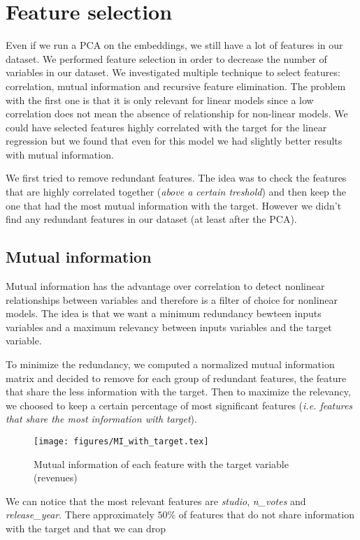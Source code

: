 \section{Feature selection}

Even if we run a PCA on the embeddings, we still have a lot of features in our dataset. We performed feature selection in order to decrease the number of variables in our dataset. We investigated multiple technique to select features: correlation, mutual information and recursive feature elimination. The problem with the first one is that it is only relevant for linear models since a low correlation does not mean the absence of relationship for non-linear models. We could have selected features highly correlated with the target for the linear regression but we found that even for this model we had slightly better results with mutual information.

We first tried to remove redundant features. The idea was to check the features that are highly correlated together (\textit{above a certain treshold}) and then keep the one that had the most mutual information with the target. However we didn't find any redundant features in our dataset (at least after the PCA).

\subsection{Mutual information}

Mutual information has the advantage over correlation to detect nonlinear relationships between variables and therefore is a filter of choice for nonlinear models. The idea is that we want a minimum redundancy bewteen inputs variables and a maximum relevancy between inputs variables and the target variable.

To minimize the redundancy, we computed a normalized mutual information matrix and decided to remove for each group of redundant features, the feature that share the less information with the target.
Then to maximize the relevancy, we choosed to keep a certain percentage of most significant features (\textit{i.e. features that share the most information with target}).

\begin{figure}[H]
	\centering
	\texttt{[image: figures/MI\_with\_target.tex]}
	\caption{Mutual information of each feature with the target variable (revenues)}
	\label{fig:MI_with_target}
\end{figure}

We can notice that the most relevant features are \textit{studio}, \textit{n_votes} and \textit{release_year}. There approximately $50\%$ of features that do not share information with the target and that we can drop

